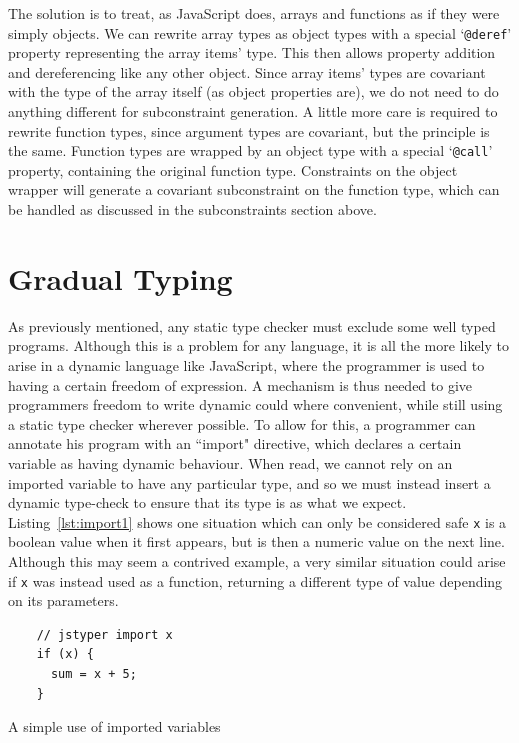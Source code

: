 \documentclass[12pt,a4paper,twoside,openright]{report}
\theoremstyle{definition}
\theoremstyle{dotless}
\newcommand*{\js}{\texttt}
\begin{document}
The solution is to treat, as JavaScript does, arrays and functions as if they
were simply objects. We can rewrite array types as object types with a special
`\texttt{@deref}' property representing the array items' type. This then allows
property addition and dereferencing like any other object. Since array items'
types are covariant with the type of the array itself (as object properties
are), we do not need to do anything different for subconstraint generation. A
little more care is required to rewrite function types, since argument types
are covariant, but the principle is the same. Function types are wrapped by an
object type with a special `\texttt{@call}' property, containing the original
function type. Constraints on the object wrapper will generate a covariant
subconstraint on the function type, which can be handled as discussed in the
subconstraints section above.

\section{Gradual Typing}

As previously mentioned, any static type checker must exclude some well typed
programs.  Although this is a problem for any language, it is all the more
likely to arise in a dynamic language like JavaScript, where the programmer is
used to having a certain freedom of expression. A mechanism is thus needed to
give programmers freedom to write dynamic could where convenient, while still
using a static type checker wherever possible. To allow for this, a programmer
can annotate his program with an ``import" directive, which declares a certain
variable as having dynamic behaviour. When read, we cannot rely on an imported
variable to have any particular type, and so we must instead insert a dynamic
type-check to ensure that its type is as what we expect.
Listing~\ref{lst:import1} shows one situation which can only be considered safe
\js{x} is a boolean value when it first appears, but is then a numeric value on
the next line. Although this may seem a contrived example, a very similar
situation could arise if \js{x} was instead used as a function, returning a
different type of value depending on its parameters.
\begin{program}
  \begin{verbatim}
	// jstyper import x
	if (x) {
	  sum = x + 5;
	}
  \end{verbatim}
  \caption{A simple use of imported variables}\label{lst:import1}
\end{program}
\end{document}
